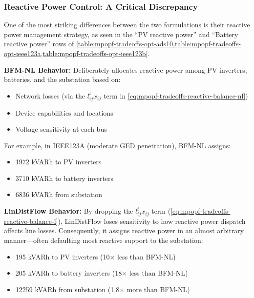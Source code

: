 \subsubsection{Reactive Power Control: A Critical Discrepancy}

One of the most striking differences between the two formulations is their reactive power management strategy, as seen in the ``PV reactive power'' and ``Battery reactive power'' rows of \cref{table:mpopf-tradeoffs-opt-ads10,table:mpopf-tradeoffs-opt-ieee123a,table:mpopf-tradeoffs-opt-ieee123b}.

\textbf{BFM-NL Behavior:} Deliberately allocates reactive power among PV inverters, batteries, and the substation based on:
\begin{itemize}
    \item Network losses (via the \(l_{ij}^t x_{ij}\) term in \cref{eq:mpopf-tradeoffs-reactive-balance-nl})
    \item Device capabilities and locations
    \item Voltage sensitivity at each bus
\end{itemize}

For example, in IEEE123A (moderate GED penetration), BFM-NL assigns:
\begin{itemize}
    \item 1972 kVARh to PV inverters
    \item 3710 kVARh to battery inverters
    \item 6836 kVARh from substation
\end{itemize}

\textbf{LinDistFlow Behavior:} By dropping the \(l_{ij}^t x_{ij}\) term (\cref{eq:mpopf-tradeoffs-reactive-balance-l}), LinDistFlow loses sensitivity to how reactive power dispatch affects line losses. Consequently, it assigns reactive power in an almost arbitrary manner—often defaulting most reactive support to the substation:
\begin{itemize}
    \item 195 kVARh to PV inverters (10× less than BFM-NL)
    \item 205 kVARh to battery inverters (18× less than BFM-NL)
    \item 12259 kVARh from substation (1.8× more than BFM-NL)
\end{itemize}

